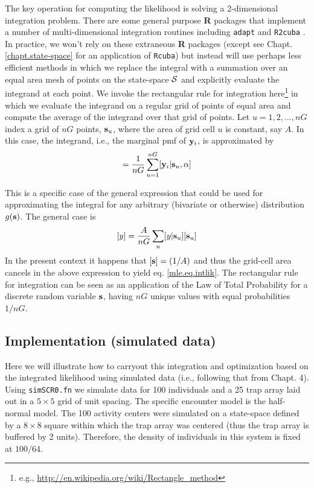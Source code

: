 The key operation for computing the likelihood is solving a
2-dimensional integration problem. There are some general purpose {\bf
  R} packages that implement a number of 
 multi-dimensional integration routines
including \mbox{\tt adapt} \citep{genz_etal:2007} and \mbox{\tt R2cuba}
\citep{hahn_etal:2011}.  In practice, we won't rely
on these extraneous {\bf R} packages (except see
Chapt. \ref{chapt.state-space} for an application of \mbox{\tt Rcuba})
but instead will use perhaps less
efficient methods in which we replace the integral with a summation
over an equal area mesh of points on the state-space ${\cal S}$ and explicitly
evaluate the integrand at each point. We invoke the rectangular rule
for integration here\footnote{e.g., 
\url{http://en.wikipedia.org/wiki/Rectangle_method}
} in which we
evaluate the
integrand on a regular grid of points of equal area and compute the
average of
the integrand over that grid of points. 
Let $u=1,2,\ldots,nG$ index a grid of
$nG$ points, ${\bf s}_{u}$,  where the area of grid cell $u$ is
constant, say $A$.
In this case, the integrand, i.e., the marginal pmf of 
${\bf y}_{i}$, is approximated by  
\begin{equation}
         [{\bf y}_{i}|\alpha] = \frac{1}{nG} \sum_{u=1}^{nG}  [ {\bf
            y}_{i} |{\bf s}_u, \alpha]
\label{mle.eq.intlik}
\end{equation}

This is a specific case of the general expression that could be used
for approximating the integral for any arbitrary (bivariate or otherwise)
distribution $g({\bf s})$. The general case is
\[
[y]  = \frac{A}{nG} \sum_{u} [y|{\bf s}_{u}] [{\bf s}_{u}]
\]
 In the present context it happens that  $[{\bf s}] = (1/A)$
and thus the grid-cell area cancels in the above
expression to yield eq. \ref{mle.eq.intlik}.
The rectangular rule for integration can be seen as an application of
the Law of Total Probability for a discrete random variable ${\bf
  s}$, having $nG$ 
unique values with equal probabilities $1/nG$.



\subsection{ Implementation (simulated data)}

Here we will illustrate how to carryout this integration and
optimization based on the integrated likelihood using simulated data
 (i.e., following that from Chapt. 4). Using \mbox{\tt simSCR0.fn}
 we simulate data for 100 individuals and a 25 trap array
laid out in a $5 \times 5$ grid of unit spacing.  The specific encounter
model is the half-normal model. The 100 activity centers were
simulated on a state-space defined by a $8 \times 8$ square 
within which the
trap array was centered (thus the trap array is buffered by 2
units). Therefore, the density of individuals in this system is fixed
at $100/64$.

